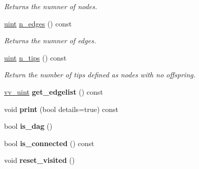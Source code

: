 \begin{DoxyCompactItemize}
\begin{DoxyCompactList}\small\item\em Returns the numner of nodes. \end{DoxyCompactList}\item 
\hyperlink{namespacepruner_a659e6e64a9e2b8e981c3d34262a2f67e}{uint} \hyperlink{classpruner_1_1Tree_a88d91ac33a6746c502884855f9edc5c2}{n\+\_\+edges} () const \hypertarget{classpruner_1_1Tree_a88d91ac33a6746c502884855f9edc5c2}{}\label{classpruner_1_1Tree_a88d91ac33a6746c502884855f9edc5c2}

\begin{DoxyCompactList}\small\item\em Returns the numner of edges. \end{DoxyCompactList}\item 
\hyperlink{namespacepruner_a659e6e64a9e2b8e981c3d34262a2f67e}{uint} \hyperlink{classpruner_1_1Tree_a0fd92859e0d3e125de6ae4b4af0e301a}{n\+\_\+tips} () const \hypertarget{classpruner_1_1Tree_a0fd92859e0d3e125de6ae4b4af0e301a}{}\label{classpruner_1_1Tree_a0fd92859e0d3e125de6ae4b4af0e301a}

\begin{DoxyCompactList}\small\item\em Return the number of tips defined as nodes with no offspring. \end{DoxyCompactList}\item 
\hyperlink{namespacepruner_acc0badaa0c5a170f5f93cfc20ec428a2}{vv\+\_\+uint} {\bfseries get\+\_\+edgelist} () const \hypertarget{classpruner_1_1Tree_a700fd8abdcb805f53999b2fb00fc2710}{}\label{classpruner_1_1Tree_a700fd8abdcb805f53999b2fb00fc2710}

\item 
void {\bfseries print} (bool details=true) const \hypertarget{classpruner_1_1Tree_afe757ac173ac177a0ebefd222a06eed5}{}\label{classpruner_1_1Tree_afe757ac173ac177a0ebefd222a06eed5}

\item 
bool {\bfseries is\+\_\+dag} ()\hypertarget{classpruner_1_1Tree_af793b391043a88ceea805b584efb982a}{}\label{classpruner_1_1Tree_af793b391043a88ceea805b584efb982a}

\item 
bool {\bfseries is\+\_\+connected} () const \hypertarget{classpruner_1_1Tree_ad47fa64c50fa9931f4e98d4dc4b94272}{}\label{classpruner_1_1Tree_ad47fa64c50fa9931f4e98d4dc4b94272}

\item 
void {\bfseries reset\+\_\+visited} ()\hypertarget{classpruner_1_1Tree_a3ff712c25817e2bb3d1a87baef7b87d0}{}\label{classpruner_1_1Tree_a3ff712c25817e2bb3d1a87baef7b87d0}


\end{DoxyCompactItemize}
